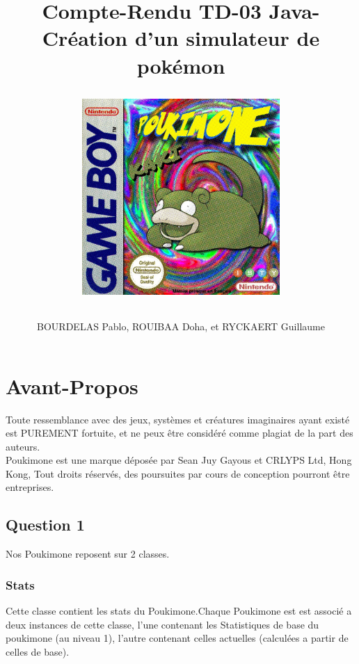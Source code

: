 \documentclass{report}
\begin{document}
\title{%
    \begin{minipage}\linewidth
        \centering
        Compte-Rendu TD-03 
        \vskip 3pt
        \large Java-Création d'un simulateur de pokémon
        \author{BOURDELAS Pablo, ROUIBAA Doha, et RYCKAERT Guillaume}
    \end{minipage}
\begin{figure}[ht!]
    \centering
    \includegraphics[width=75mm]{cover.jpg}
\end{figure}
    }   

\maketitle

\chapter*{Avant-Propos}
Toute ressemblance avec des jeux, systèmes et créatures imaginaires ayant existé est PUREMENT fortuite, et ne peux être considéré comme plagiat de la part des auteurs.\\
Poukimone est une marque déposée par Sean Juy Gayous et CRLYPS Ltd, Hong Kong, Tout droits réservés, des poursuites par cours de conception pourront être entreprises.
 
\newpage
\section*{Question 1}

Nos Poukimone reposent sur 2 classes.
\subsection*{Stats}
Cette classe contient les stats du Poukimone.Chaque Poukimone est est associé a deux instances de cette classe, l'une contenant les Statistiques de base du poukimone (au niveau 1), l'autre contenant celles actuelles (calculées a partir de celles de base).
\end{document}
